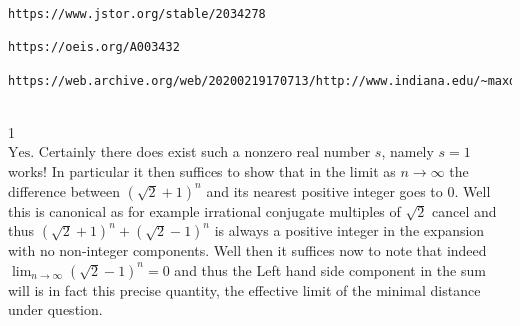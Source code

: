 \begin{verbatim}
https://www.jstor.org/stable/2034278

https://oeis.org/A003432

https://web.archive.org/web/20200219170713/http://www.indiana.edu/~maxdet/
\end{verbatim}




 \\
1 \\
$\boxed{\text{Yes}}$. Certainly there does exist such a nonzero real number $s$, namely $\boxed{s=1}$ works! In particular it then suffices to show that in the limit as $n \to \infty$ the difference between $\left( \sqrt{2}+1 \right)^n$ and its nearest positive integer goes to $0$. Well this is canonical as for example irrational conjugate multiples of $\sqrt{2}$ cancel and thus $\left( \sqrt{2} + 1 \right)^n + \left( \sqrt{2} - 1 \right)^n$ is always a positive integer in the expansion with no non-integer components. Well then it suffices now to note that indeed $\lim_{n \to \infty} \left( \sqrt{2} - 1 \right)^n = 0$ and thus the Left hand side component in the sum will is in fact this precise quantity, the effective limit of the minimal distance under question.

